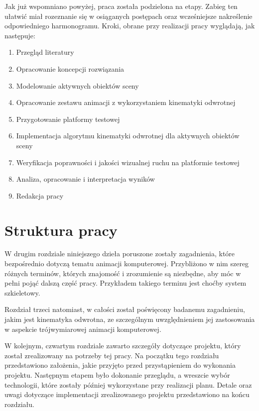 \documentclass[11pt]{mwrep}
\begin{document}
  Jak już wspomniano powyżej, praca została podzielona na etapy. Zabieg ten ułatwić miał rozeznanie się w osiąganych postępach oraz wcześniejsze nakreślenie odpowiedniego harmonogramu. Kroki, obrane przy realizacji pracy wyglądają, jak następuje:

  \begin{enumerate}

  \item Przegląd literatury
  \item Opracowanie koncepcji rozwiązania
  \item Modelowanie aktywnych obiektów sceny
  \item Opracowanie zestawu animacji z wykorzystaniem kinematyki odwrotnej
  \item Przygotowanie platformy testowej
  \item Implementacja algorytmu kinematyki odwrotnej dla aktywnych obiektów sceny
  \item Weryfikacja poprawności i jakości wizualnej ruchu na platformie testowej
  \item Analiza, opracowanie i interpretacja wyników
  \item Redakcja pracy

  \end{enumerate}

\pagebreak

  \section{Struktura pracy}

  W drugim rozdziale niniejszego dzieła poruszone zostały zagadnienia, które bezpośrednio dotyczą tematu animacji komputerowej. Przybliżono w nim szereg różnych terminów, których znajomość i zrozumienie są niezbędne, aby móc w pełni pojąć dalszą część pracy. Przykładem takiego terminu jest choćby system szkieletowy.

  Rozdział trzeci natomiast, w całości został poświęcony badanemu zagadnieniu, jakim jest kinematyka odwrotna, ze szczególnym uwzględnieniem jej zastosowania w aspekcie trójwymiarowej animacji komputerowej.
  
  W kolejnym, czwartym rozdziale zawarto szczegóły dotyczące projektu, który został zrealizowany na potrzeby tej pracy. Na początku tego rozdziału przedstawiono założenia, jakie przyjęto przed przystąpieniem do wykonania projektu. Następnym etapem było dokonanie przeglądu, a wreszcie wybór technologii, które zostały później wykorzystane przy realizacji planu. Detale oraz uwagi dotyczące implementacji zrealizowanego projektu przedstawiono na końcu rozdziału.
\end{document}
